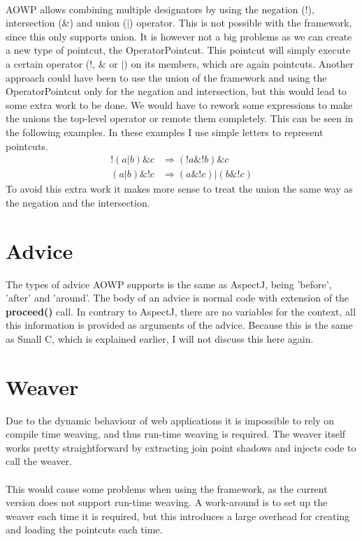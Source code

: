 \documentclass[a4paper]{report}
\begin{document}
\\
AOWP allows combining multiple designators by using the negation (!), intersection (\&) and union ($|$) operator. This is not possible with the framework, since this only supports union. It is however not a big problems as we can create a new type of pointcut, the OperatorPointcut. This pointcut will simply execute a certain operator (!, \& or $|$) on its members, which are again pointcuts. Another approach could have been to use the union of the framework and using the OperatorPointcut only for the negation and intersection, but this would lead to some extra work to be done. We would have to rework some expressions to make the unions the top-level operator or remote them completely. This can be seen in the following examples. In these examples I use simple letters to represent pointcuts.\\
\begin{align*}
!\left(a | b\right) \& c & \Rightarrow \left(!a \& !b\right) \& c\\
\left(a | b \right) \& !c & \Rightarrow \left(a \& !c\right) | \left(b \& !c \right)
\end{align*}
To avoid this extra work it makes more sense to treat the union the same way as the negation and the intersection.

\section{Advice}
The types of advice AOWP supports is the same as AspectJ, being 'before', 'after' and 'around'. The body of an advice is normal code with extension of the \textbf{proceed()} call. In contrary to AspectJ, there are no variables for the context, all this information is provided as arguments of the advice. Because this is the same as Small C, which is explained earlier, I will not discuss this here again.

\section{Weaver}
Due to the dynamic behaviour of web applications it is impossible to rely on compile time weaving, and thus run-time weaving is required. The weaver itself works pretty straightforward by extracting join point shadows and injects code to call the weaver.\\
\\
This would cause some problems when using the framework, as the current version does not support run-time weaving. A work-around is to set up the weaver each time it is required, but this introduces a large overhead for creating and loading the pointcuts each time.
\end{document}
